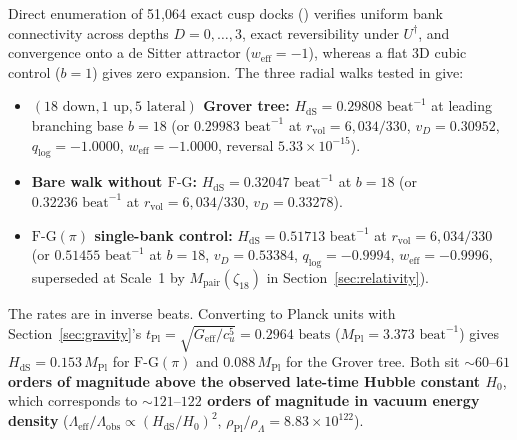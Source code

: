 Direct enumeration of 51,064 exact cusp docks () verifies uniform bank connectivity across depths
$D = 0, \dots, 3$, exact reversibility under $U^\dagger$, and convergence onto a de Sitter attractor ($w_{\mathrm{eff}} = -1$),
whereas a flat 3D cubic control ($b = 1$) gives zero expansion. The three radial walks tested in  give:
\begin{itemize}[itemsep=2pt]
\item \textbf{$(18\text{ down}, 1\text{ up}, 5\text{ lateral})$ Grover tree:} $H_{\mathrm{dS}} = 0.29808\text{ beat}^{-1}$
at leading branching base $b = 18$ (or $0.29983\text{ beat}^{-1}$ at $r_{\mathrm{vol}} = 6{,}034/330$, $v_D = 0.30952$,
$q_{\log} = -1.0000$, $w_{\mathrm{eff}} = -1.0000$, reversal $5.33 \times 10^{-15}$).
\item \textbf{Bare walk without $\mathrm{F\text{-}G}$:} $H_{\mathrm{dS}} = 0.32047\text{ beat}^{-1}$ at $b = 18$ (or
$0.32236\text{ beat}^{-1}$ at $r_{\mathrm{vol}} = 6{,}034/330$, $v_D = 0.33278$).
\item \textbf{$\mathrm{F\text{-}G}(\pi)$ single-bank control:} $H_{\mathrm{dS}} = 0.51713\text{ beat}^{-1}$ at
$r_{\mathrm{vol}} = 6{,}034/330$ (or $0.51455\text{ beat}^{-1}$ at $b = 18$, $v_D = 0.53384$, $q_{\log} = -0.9994$,
$w_{\mathrm{eff}} = -0.9996$, superseded at Scale~1 by $M_{\mathrm{pair}}(\zeta_{18})$ in Section~\ref{sec:relativity}).
\end{itemize}

The rates are in inverse beats. Converting to Planck units with Section~\ref{sec:gravity}'s $t_{\mathrm{Pl}} = \sqrt{G_{\mathrm{eff}}/c_u^5} =
0.2964\text{ beats}$ ($M_{\mathrm{Pl}} = 3.373\text{ beat}^{-1}$) gives {\bfseries\boldmath $H_{\mathrm{dS}} =
0.153\, M_{\mathrm{Pl}}$} for $\mathrm{F\text{-}G}(\pi)$ and {\bfseries\boldmath $0.088\, M_{\mathrm{Pl}}$} for the
Grover tree. Both sit {\bfseries\boldmath $\sim 60\text{--}61$ orders of magnitude above the observed
late-time Hubble constant $H_0$}, which corresponds to {\bfseries\boldmath $\sim 121\text{--}122$ orders of magnitude
in vacuum energy density} ($\Lambda_{\mathrm{eff}}/\Lambda_{\mathrm{obs}} \propto (H_{\mathrm{dS}}/H_0)^2$,
$\rho_{\mathrm{Pl}}/\rho_\Lambda = 8.83 \times 10^{122}$).

